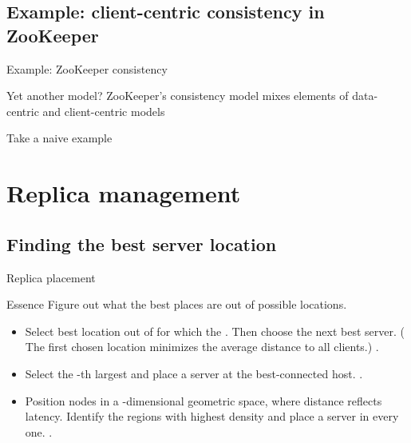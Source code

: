 \subsection{Example: client-centric consistency in ZooKeeper}
\begin{slide}{Example: ZooKeeper consistency}
  \begin{block}{Yet another model?}
    ZooKeeper's consistency model mixes elements of data-centric and client-centric models
  \end{block}
  \begin{exampleblock}{Take a naive example}
    \begin{centerfig}
    \end{centerfig}
  \end{exampleblock}
\end{slide}
\section{Replica management}
\subsection{Finding the best server location}
\begin{slide}{Replica placement}
  \begin{block}{Essence}
    Figure out what the best  places are out of  possible locations.
    \begin{itemize}
    \item<2-> Select best location out of  for which the . Then choose the next best server. ( The first chosen location minimizes the
      average distance to all clients.) .
    \item<3-> Select the -th largest  and place a server at the
      best-connected host. .
    \item<4-> Position nodes in a -dimensional geometric space, where distance reflects
      latency. Identify the  regions with highest density and place a server in every
      one. .
    \end{itemize}
  \end{block}
\end{slide}
